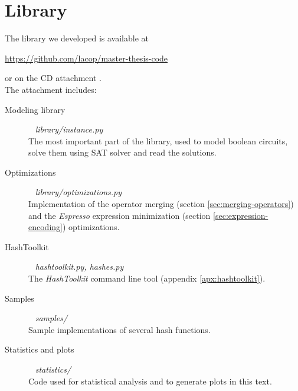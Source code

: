 \chapter{Library}
\label{apx:library}

The library  we developed is available at
\begin{center}
\url{https://github.com/lacop/master-thesis-code}
\end{center}
or on the CD attachment \cite{papay2016code}.
~\\

\noindent The attachment includes:
\begin{description}
\item[Modeling library] ~ \emph{library/instance.py} \\
The most important part of the library, used to model boolean circuits, solve them using SAT solver and read the solutions.

\item[Optimizations] ~ \emph{library/optimizations.py} \\
Implementation of the operator merging (section \ref{sec:merging-operators}) and the \emph{Espresso} expression minimization (section \ref{sec:expression-encoding}) optimizations.

\item[HashToolkit] ~ \emph{hashtoolkit.py, hashes.py} \\
The \emph{HashToolkit} command line tool (appendix \ref{apx:hashtoolkit}).

\item[Samples] ~ \emph{samples/} \\
Sample implementations of several hash functions.

\item[Statistics and plots] ~ \emph{statistics/} \\
Code used for statistical analysis and to generate plots in this text.
\end{description}